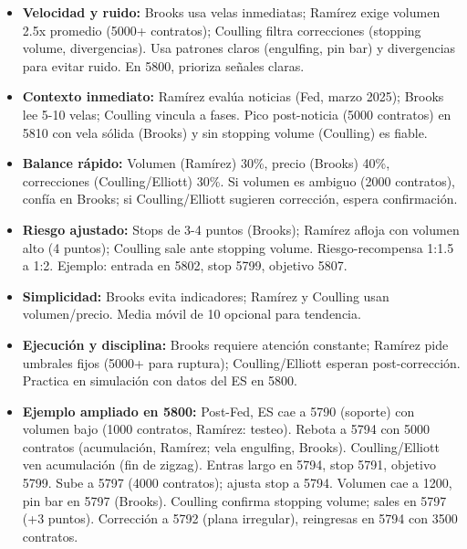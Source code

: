 \begin{itemize}
    \item \textbf{Velocidad y ruido:} Brooks usa velas inmediatas; Ram\'irez exige volumen 2.5x promedio (5000+ contratos); Coulling filtra correcciones (stopping volume, divergencias). Usa patrones claros (engulfing, pin bar) y divergencias para evitar ruido. En 5800, prioriza se\~{n}ales claras.

    \item \textbf{Contexto inmediato:} Ram\'irez eval\'ua noticias (Fed, marzo 2025); Brooks lee 5-10 velas; Coulling vincula a fases. Pico post-noticia (5000 contratos) en 5810 con vela s\'olida (Brooks) y sin stopping volume (Coulling) es fiable.

    \item \textbf{Balance r\'{a}pido:} Volumen (Ram\'irez) 30\%, precio (Brooks) 40\%, correcciones (Coulling/Elliott) 30\%. Si volumen es ambiguo (2000 contratos), conf\'ia en Brooks; si Coulling/Elliott sugieren correcci\'{o}n, espera confirmaci\'{o}n.

    \item \textbf{Riesgo ajustado:} Stops de 3-4 puntos (Brooks); Ram\'irez afloja con volumen alto (4 puntos); Coulling sale ante stopping volume. Riesgo-recompensa 1:1.5 a 1:2. Ejemplo: entrada en 5802, stop 5799, objetivo 5807.

    \item \textbf{Simplicidad:} Brooks evita indicadores; Ram\'irez y Coulling usan volumen/precio. Media m\'ovil de 10 opcional para tendencia.

    \item \textbf{Ejecuci\'{o}n y disciplina:} Brooks requiere atenci\'on constante; Ram\'irez pide umbrales fijos (5000+ para ruptura); Coulling/Elliott esperan post-correcci\'{o}n. Practica en simulaci\'on con datos del ES en 5800.

    \item \textbf{Ejemplo ampliado en 5800:} Post-Fed, ES cae a 5790 (soporte) con volumen bajo (1000 contratos, Ram\'irez: testeo). Rebota a 5794 con 5000 contratos (acumulaci\'{o}n, Ram\'irez; vela engulfing, Brooks). Coulling/Elliott ven acumulaci\'{o}n (fin de zigzag). Entras largo en 5794, stop 5791, objetivo 5799. Sube a 5797 (4000 contratos); ajusta stop a 5794. Volumen cae a 1200, pin bar en 5797 (Brooks). Coulling confirma stopping volume; sales en 5797 (+3 puntos). Correcci\'{o}n a 5792 (plana irregular), reingresas en 5794 con 3500 contratos.
\end{itemize}


